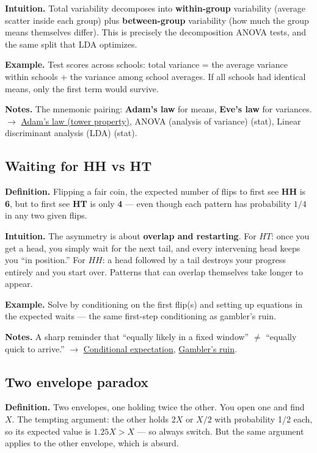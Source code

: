 \documentclass[11pt,a4paper]{article}
\begin{document}
\textbf{Intuition.} Total variability decomposes into \textbf{within-group} variability (average scatter inside each group) plus \textbf{between-group} variability (how much the group means themselves differ). This is precisely the decomposition ANOVA tests, and the same split that LDA optimizes.

\textbf{Example.} Test scores across schools: total variance = the average variance within schools + the variance among school averages. If all schools had identical means, only the first term would survive.

\textbf{Notes.} The mnemonic pairing: \textbf{Adam's law} for means, \textbf{Eve's law} for variances. $\to$ \hyperref[sec:adams-law-tower-property]{Adam's law (tower property)}, ANOVA (analysis of variance) (stat), Linear discriminant analysis (LDA) (stat).

\subsection{Waiting for HH vs HT}\label{sec:waiting-for-hh-vs-ht}

\textbf{Definition.} Flipping a fair coin, the expected number of flips to first see \textbf{HH} is \textbf{6}, but to first see \textbf{HT} is only \textbf{4} --- even though each pattern has probability $1/4$ in any two given flips.

\textbf{Intuition.} The asymmetry is about \textbf{overlap and restarting}. For $HT$: once you get a head, you simply wait for the next tail, and every intervening head keeps you ``in position.'' For $HH$: a head followed by a tail destroys your progress entirely and you start over. Patterns that can overlap themselves take longer to appear.

\textbf{Example.} Solve by conditioning on the first flip(s) and setting up equations in the expected waits --- the same first-step conditioning as gambler's ruin.

\textbf{Notes.} A sharp reminder that ``equally likely in a fixed window'' $\neq$ ``equally quick to arrive.'' $\to$ \hyperref[sec:conditional-expectation]{Conditional expectation}, \hyperref[sec:gamblers-ruin]{Gambler's ruin}.

\subsection{Two envelope paradox}\label{sec:two-envelope-paradox}

\textbf{Definition.} Two envelopes, one holding twice the other. You open one and find $X$. The tempting argument: the other holds $2X$ or $X/2$ with probability 1/2 each, so its expected value is $1.25X > X$ --- so always switch. But the same argument applies to the other envelope, which is absurd.
\end{document}
